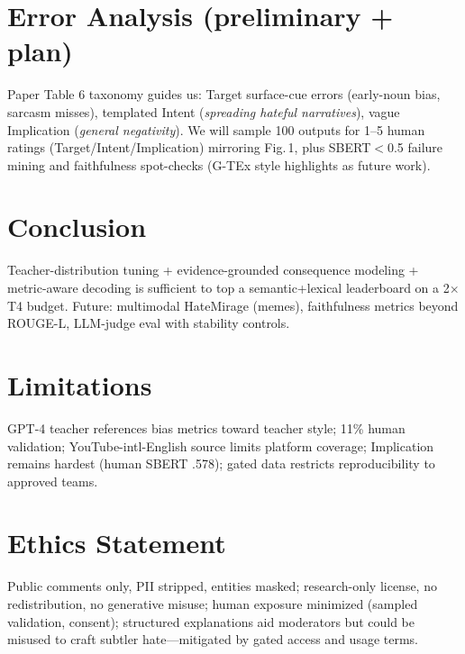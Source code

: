 \documentclass[11pt]{article}
\begin{document}
\section{Error Analysis (preliminary + plan)}
Paper Table 6 taxonomy guides us: Target surface-cue errors (early-noun bias, sarcasm misses), templated Intent (\textit{spreading hateful narratives}), vague Implication (\textit{general negativity}).
We will sample 100 outputs for 1--5 human ratings (Target/Intent/Implication) mirroring Fig.\,1, plus SBERT$<$0.5 failure mining and faithfulness spot-checks (G-TEx style highlights as future work).

\section{Conclusion}
Teacher-distribution tuning + evidence-grounded consequence modeling + metric-aware decoding is sufficient to top a semantic+lexical leaderboard on a 2$\times$T4 budget.
Future: multimodal HateMirage (memes), faithfulness metrics beyond ROUGE-L, LLM-judge eval with stability controls.

\section*{Limitations}
GPT-4 teacher references bias metrics toward teacher style; 11\% human validation; YouTube-intl-English source limits platform coverage; Implication remains hardest (human SBERT .578); gated data restricts reproducibility to approved teams.

\section*{Ethics Statement}
Public comments only, PII stripped, entities masked; research-only license, no redistribution, no generative misuse; human exposure minimized (sampled validation, consent); structured explanations aid moderators but could be misused to craft subtler hate---mitigated by gated access and usage terms.

\appendix
\end{document}
